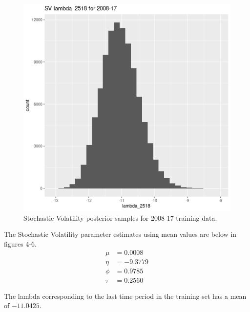 \documentclass[12pt,letterpaper,reqno,fleqn]{article}
\begin{document}
\begin{figure}
\includegraphics[scale = .4]{svlT0817}
\caption{Stochastic Volatility posterior samples for 2008-17 training data.}
\end{figure}

The Stochastic Volatility parameter estimates using mean values are below in figures 4-6.
\begin{align*}
\mu &= 0.0008 \\
\eta &= -9.3779 \\
\phi &= 0.9785 \\
\tau &= 0.2560
\end{align*}

The lambda corresponding to the last time period in the training set has a mean of $-11.0425$.
\end{document}
